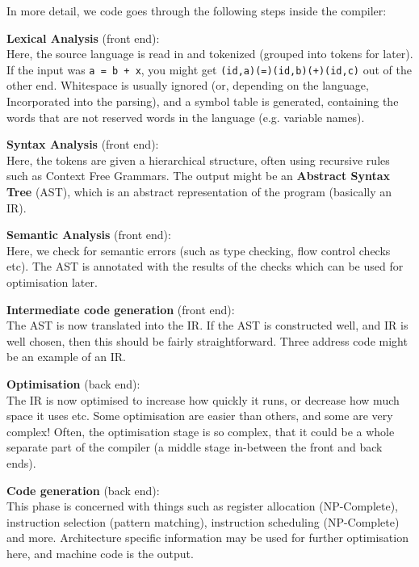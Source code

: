 In more detail, we code goes through the following steps inside the compiler:

\begin{description}
  \item \textbf{Lexical Analysis} (front end):\\
  Here, the source language is read in and tokenized (grouped into tokens for 
  later). If the input was \texttt{a = b + x}, you might get
  \texttt{(id,a)(=)(id,b)(+)(id,c)} out of the other end. Whitespace is usually
  ignored (or, depending on the language, Incorporated into the parsing), and
  a symbol table is generated, containing the words that are not reserved words
  in the language (e.g. variable names).

  \item \textbf{Syntax Analysis} (front end):\\
  Here, the tokens are given a hierarchical structure, often using recursive
  rules such as Context Free Grammars. The output might be an \textbf{Abstract
  Syntax Tree} (AST), which is an abstract representation of the program
  (basically an IR).

  \item \textbf{Semantic Analysis} (front end):\\
  Here, we check for semantic errors (such as type checking, flow control
  checks etc). The AST is annotated with the results of the checks which can be
  used for optimisation later.

  \item \textbf{Intermediate code generation} (front end):\\
  The AST is now translated into the IR. If the AST is constructed well, and IR
  is well chosen, then this should be fairly straightforward. Three address code
  might be an example of an IR.

  \item \textbf{Optimisation} (back end):\\
  The IR is now optimised to increase how quickly it runs, or decrease how much
  space it uses etc. Some optimisation are easier than others, and some are
  very complex! Often, the optimisation stage is so complex, that it could be
  a whole separate part of the compiler (a middle stage in-between the front and
  back ends).

  \item \textbf{Code generation} (back end):\\
  This phase is concerned with things such as register allocation (NP-Complete),
  instruction selection (pattern matching), instruction scheduling (NP-Complete)
  and more. Architecture specific information may be used for further
  optimisation here, and machine code is the output.
\end{description}


